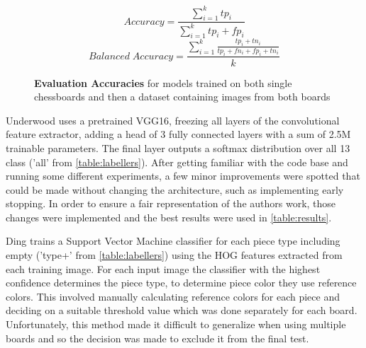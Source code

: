\begin{equation}
    Accuracy = \frac{ \sum_{i=1}^{k}{tp_i} }{ \sum_{i=1}^{k}{tp_i + fp_i} }
\end{equation}
\begin{equation}
    Balanced\;Accuracy = \frac{\sum_{i=1}^{k}{ \frac{tp_i+tn_i}{tp_i+fn_i+fp_i+tn_i}} }{k}
\end{equation}

\begin{figure}[h]
\caption{\textbf{Evaluation Accuracies} for models trained on both single chessboards and then a dataset containing images from both boards}
\label{table:results}
\end{figure}

Underwood uses a pretrained VGG16, freezing all layers of the convolutional feature extractor, adding a head of 3 fully connected layers with a sum of 2.5M 
trainable parameters.
The final layer outputs a softmax distribution over all 13 class ('all' from \autoref{table:labellers}).  After getting familiar with the code base and running some 
different experiments, a few minor improvements were spotted that could be made without changing the architecture, such as implementing early stopping. 
In order to ensure a fair representation of the authors work, those changes were implemented and the best results were used in \autoref{table:results}.

Ding trains a Support Vector Machine classifier for each piece type including empty ('type+' from \autoref{table:labellers}) using the HOG features extracted 
from each training image.  For each input image the classifier with the highest confidence determines the piece type, to determine piece color they use reference colors.
This involved manually calculating reference colors for each piece and deciding on a suitable threshold value which was done separately for each board.  Unfortunately,
this method made it difficult to generalize when using multiple boards and so the decision was made to exclude it from the final test.

